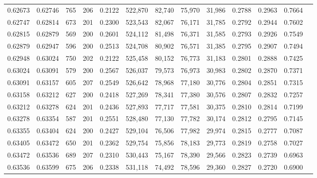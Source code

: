 \begin{tabular}{rrrrrrrrrrrrr}
0.62673 & 0.62746 &   765 & 206 &                                     0.2122 & 522,870 &  82,740 &  75,970 &  31,986 & 0.2788 & 0.2963 & 0.7664 \\
0.62747 & 0.62814 &   673 & 201 &                                     0.2300 & 523,543 &  82,067 &  76,171 &  31,785 & 0.2792 & 0.2944 & 0.7602 \\
0.62815 & 0.62879 &   569 & 200 &                                     0.2601 & 524,112 &  81,498 &  76,371 &  31,585 & 0.2793 & 0.2926 & 0.7549 \\
0.62879 & 0.62947 &   596 & 200 &                                     0.2513 & 524,708 &  80,902 &  76,571 &  31,385 & 0.2795 & 0.2907 & 0.7494 \\
0.62948 & 0.63024 &   750 & 202 &                                     0.2122 & 525,458 &  80,152 &  76,773 &  31,183 & 0.2801 & 0.2888 & 0.7425 \\
0.63024 & 0.63091 &   579 & 200 &                                     0.2567 & 526,037 &  79,573 &  76,973 &  30,983 & 0.2802 & 0.2870 & 0.7371 \\
0.63091 & 0.63157 &   605 & 207 &                                     0.2549 & 526,642 &  78,968 &  77,180 &  30,776 & 0.2804 & 0.2851 & 0.7315 \\
0.63158 & 0.63212 &   627 & 200 &                                     0.2418 & 527,269 &  78,341 &  77,380 &  30,576 & 0.2807 & 0.2832 & 0.7257 \\
0.63212 & 0.63278 &   624 & 201 &                                     0.2436 & 527,893 &  77,717 &  77,581 &  30,375 & 0.2810 & 0.2814 & 0.7199 \\
0.63278 & 0.63354 &   587 & 201 &                                     0.2551 & 528,480 &  77,130 &  77,782 &  30,174 & 0.2812 & 0.2795 & 0.7145 \\
0.63355 & 0.63404 &   624 & 200 &                                     0.2427 & 529,104 &  76,506 &  77,982 &  29,974 & 0.2815 & 0.2777 & 0.7087 \\
0.63405 & 0.63472 &   650 & 201 &                                     0.2362 & 529,754 &  75,856 &  78,183 &  29,773 & 0.2819 & 0.2758 & 0.7027 \\
0.63472 & 0.63536 &   689 & 207 &                                     0.2310 & 530,443 &  75,167 &  78,390 &  29,566 & 0.2823 & 0.2739 & 0.6963 \\
0.63536 & 0.63599 &   675 & 206 &                                     0.2338 & 531,118 &  74,492 &  78,596 &  29,360 & 0.2827 & 0.2720 & 0.6900 \\

\end{tabular}
